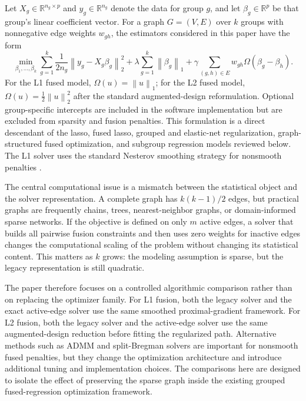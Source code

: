 \documentclass[twoside,11pt]{article}
\newcommand{\R}{\mathbb{R}}
\newcommand{\norm}[1]{\left\lVert #1 \right\rVert}
\begin{document}
Let $X_g \in \R^{n_g \times p}$ and $y_g \in \R^{n_g}$ denote the data for
group $g$, and let $\beta_g \in \R^p$ be that group's linear coefficient
vector. For a graph $G=(V,E)$ over $k$ groups with nonnegative edge weights
$w_{gh}$, the estimators considered in this paper have the form
\begin{equation}
\label{eq:model}
  \min_{\beta_1,\ldots,\beta_k}
  \sum_{g=1}^{k} \frac{1}{2 n_g} \norm{y_g - X_g \beta_g}_2^2
  + \lambda \sum_{g=1}^{k} \norm{\beta_g}_1
  + \gamma \sum_{(g,h)\in E} w_{gh} \Omega(\beta_g-\beta_h).
\end{equation}
For the L1 fused model, $\Omega(u)=\norm{u}_1$; for the L2 fused model,
$\Omega(u)=\frac{1}{2}\norm{u}_2^2$ after the standard augmented-design
reformulation. Optional group-specific intercepts are included in the
software implementation but are excluded from sparsity and fusion penalties.
This formulation is a direct descendant of the lasso, fused lasso, grouped
and elastic-net regularization, graph-structured fused optimization, and
subgroup regression models reviewed below. The L1 solver uses the standard
Nesterov smoothing strategy for nonsmooth penalties \citep{nesterov2005smooth}.

The central computational issue is a mismatch between the statistical object
and the solver representation. A complete graph has $k(k-1)/2$ edges, but
practical graphs are frequently chains, trees, nearest-neighbor graphs, or
domain-informed sparse networks. If the objective is defined on only $m$
active edges, a solver that builds all pairwise fusion constraints and then
uses zero weights for inactive edges changes the computational scaling of the
problem without changing its statistical content. This matters as $k$ grows:
the modeling assumption is sparse, but the legacy representation is still
quadratic.

The paper therefore focuses on a controlled algorithmic comparison rather than
on replacing the optimizer family. For L1 fusion, both the legacy solver and
the exact active-edge solver use the same smoothed proximal-gradient
framework. For L2 fusion, both the legacy solver and the active-edge solver
use the same augmented-design reduction before fitting the regularized path.
Alternative methods such as ADMM and split-Bregman solvers are important for
nonsmooth fused penalties, but they change the optimization architecture and
introduce additional tuning and implementation choices. The comparisons here
are designed to isolate the effect of preserving the sparse graph inside the
existing grouped fused-regression optimization framework.
\end{document}
